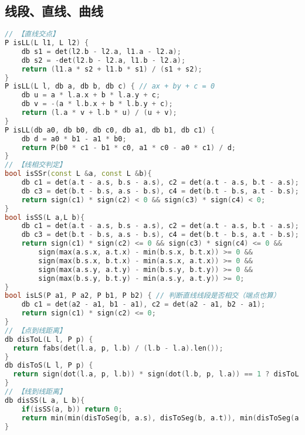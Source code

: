 \subsection{线段、直线、曲线}
\begin{lstlisting}[language=C++]
// 【直线交点】
P isLL(L l1, L l2) {
	db s1 = det(l2.b - l2.a, l1.a - l2.a);
	db s2 = -det(l2.b - l2.a, l1.b - l2.a);
	return (l1.a * s2 + l1.b * s1) / (s1 + s2);
}
P isLL(L l, db a, db b, db c) { // ax + by + c = 0
	db u = a * l.a.x + b * l.a.y + c;
	db v = -(a * l.b.x + b * l.b.y + c);
	return (l.a * v + l.b * u) / (u + v);
}
P isLL(db a0, db b0, db c0, db a1, db b1, db c1) {
	db d = a0 * b1 - a1 * b0;
	return P(b0 * c1 - b1 * c0, a1 * c0 - a0 * c1) / d;
}
// 【线相交判定】
bool isSSr(const L &a, const L &b){
	db c1 = det(a.t - a.s, b.s - a.s), c2 = det(a.t - a.s, b.t - a.s);
	db c3 = det(b.t - b.s, a.s - b.s), c4 = det(b.t - b.s, a.t - b.s);
	return sign(c1) * sign(c2) < 0 && sign(c3) * sign(c4) < 0;
}
bool isSS(L a,L b){
	db c1 = det(a.t - a.s, b.s - a.s), c2 = det(a.t - a.s, b.t - a.s);
	db c3 = det(b.t - b.s, a.s - b.s), c4 = det(b.t - b.s, a.t - b.s);
	return sign(c1) * sign(c2) <= 0 && sign(c3) * sign(c4) <= 0 &&
		sign(max(a.s.x, a.t.x) - min(b.s.x, b.t.x)) >= 0 &&
		sign(max(b.s.x, b.t.x) - min(a.s.x, a.t.x)) >= 0 &&
		sign(max(a.s.y, a.t.y) - min(b.s.y, b.t.y)) >= 0 &&
		sign(max(b.s.y, b.t.y) - min(a.s.y, a.t.y)) >= 0;
}
bool isLS(P a1, P a2, P b1, P b2) { // 判断直线线段是否相交（端点也算）
	db c1 = det(a2 - a1, b1 - a1), c2 = det(a2 - a1, b2 - a1);
	return sign(c1) * sign(c2) <= 0;
}
// 【点到线距离】
db disToL(L l, P p) {
  return fabs(det(l.a, p, l.b) / (l.b - l.a).len());
}
db disToS(L l, P p) {
  return sign(dot(l.a, p, l.b)) * sign(dot(l.b, p, l.a)) == 1 ? disToL(l, p) : min((p - l.a).len(), (p - l.b).len());
}
// 【线到线距离】
db disSS(L a, L b){
	if(isSS(a, b)) return 0;
	return min(min(disToSeg(b, a.s), disToSeg(b, a.t)), min(disToSeg(a, b.s), disToSeg(a, b.t)));
}
\end{lstlisting}
